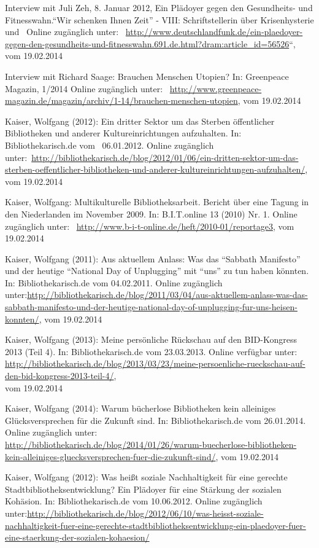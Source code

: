 \documentclass[a4paper,
fontsize=11pt,
oneside,
numbers=noperiodatend,
parskip=half-,
bibliography=totoc,
final
]{scrartcl}
\begin{document}
Interview mit Juli Zeh, 8. Januar 2012, Ein Plädoyer gegen den
Gesundheits- und Fitnesswahn.\enquote{Wir schenken Ihnen Zeit} - VIII:
Schriftstellerin über Krisenhysterie und~ Online zugänglich unter:~
\url{http://www.deutschlandfunk.de/ein-plaedoyer-gegen-den-gesundheits-und-fitnesswahn.691.de.html?dram:article_id=56526}``,
vom 19.02.2014

Interview mit Richard Saage: Brauchen Menschen Utopien? In: Greenpeace
Magazin, 1/2014 Online zugänglich unter:~
\url{http://www.greenpeace-magazin.de/magazin/archiv/1-14/brauchen-menschen-utopien},
vom 19.02.2014

Kaiser, Wolfgang (2012): Ein dritter Sektor um das Sterben öffentlicher
Bibliotheken und anderer Kultureinrichtungen aufzuhalten. In:
Bibliothekarisch.de vom~ 06.01.2012. Online zugänglich
unter:~\url{http://bibliothekarisch.de/blog/2012/01/06/ein-dritten-sektor-um-das-sterben-oeffentlicher-bibliotheken-und-anderer-kultureinrichtungen-aufzuhalten/},
vom 19.02.2014

Kaiser, Wolfgang: Multikulturelle Bibliotheksarbeit. Bericht über eine
Tagung in den Niederlanden im November 2009. In: B.I.T.online 13 (2010)
Nr. 1. Online zugänglich unter:~
\url{http://www.b-i-t-online.de/heft/2010-01/reportage3}, vom 19.02.2014

Kaiser, Wolfgang (2011): Aus aktuellem Anlass: Was das \enquote{Sabbath
Manifesto} und der heutige \enquote{National Day of Unplugging} mit
\enquote{uns} zu tun haben könnten. In: Bibliothekarisch.de vom
04.02.2011. Online zugänglich
unter:\url{http://bibliothekarisch.de/blog/2011/03/04/aus-aktuellem-anlass-was-das-sabbath-manifesto-und-der-heutige-national-day-of-unplugging-fur-uns-heisen-konnten/},
vom 19.02.2014

Kaiser, Wolfgang (2013): Meine persönliche Rückschau auf den
BID-Kongress 2013 (Teil 4). In: Bibliothekarisch.de vom 23.03.2013.
Online verfügbar unter:~
\url{http://bibliothekarisch.de/blog/2013/03/23/meine-persoenliche-rueckschau-auf-den-bid-kongress-2013-teil-4/}, \\
vom 19.02.2014

Kaiser, Wolfgang (2014): Warum bücherlose Bibliotheken kein alleiniges
Glücksversprechen für die Zukunft sind. In: Bibliothekarisch.de vom
26.01.2014. Online zugänglich unter:~
\\
\url{http://bibliothekarisch.de/blog/2014/01/26/warum-buecherlose-bibliotheken-kein-alleiniges-gluecksversprechen-fuer-die-zukunft-sind/},
vom 19.02.2014

Kaiser, Wolfgang (2012): Was heißt soziale Nachhaltigkeit für eine
gerechte Stadtbibliotheksentwicklung? Ein Plädoyer für eine Stärkung der
sozialen Kohäsion. In: Bibliothekarisch.de vom 10.06.2012. Online
zugänglich
unter:\url{http://bibliothekarisch.de/blog/2012/06/10/was-heisst-soziale-nachhaltigkeit-fuer-eine-gerechte-stadtbibliotheksentwicklung-ein-plaedoyer-fuer-eine-staerkung-der-sozialen-kohaesion/}
\end{document}
